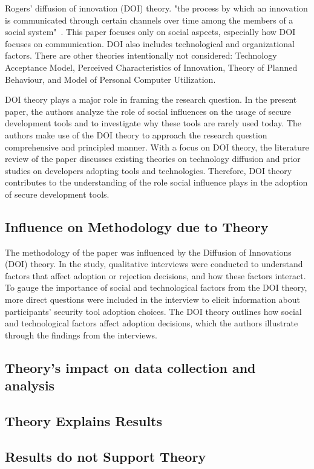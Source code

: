 \documentclass[journal,12pt,onecolumn,]{IEEEtran}
\begin{document}
Rogers' diffusion of innovation (DOI) theory.
"the process by which an innovation is communicated through certain channels over time among the members of a social system"~\cite{rogers1995attributes}.
This paper focuses only on social aspects, especially how DOI focuses on communication.
DOI also includes technological and organizational factors.
There are other theories intentionally not considered: Technology Acceptance Model, Perceived Characteristics of Innovation, Theory of Planned Behaviour, and Model of Personal Computer Utilization.

DOI theory plays a major role in framing the research question.
In the present paper, the authors analyze the role of social influences on the usage of secure development tools and to investigate why these tools are rarely used today.
The authors make use of the DOI theory to approach the research question comprehensive and principled manner.
With a focus on DOI theory, the literature review of the paper discusses existing theories on technology diffusion and prior studies on developers adopting tools and technologies.
Therefore, DOI theory contributes to the understanding of the role social influence plays in the adoption of secure development tools.


\subsection{Influence on Methodology due to Theory}

The methodology of the paper was influenced by the Diffusion of Innovations (DOI) theory.
In the study, qualitative interviews were conducted to understand factors that affect adoption or rejection decisions, and how these factors interact.
To gauge the importance of social and technological factors from the DOI theory, more direct questions were included in the interview to elicit information about participants' security tool adoption choices.
The DOI theory outlines how social and technological factors affect adoption decisions, which the authors illustrate through the findings from the interviews.


\subsection{Theory's impact on data collection and analysis}

\subsection{Theory Explains Results}
\subsection{Results do not Support Theory} %



\end{document}
